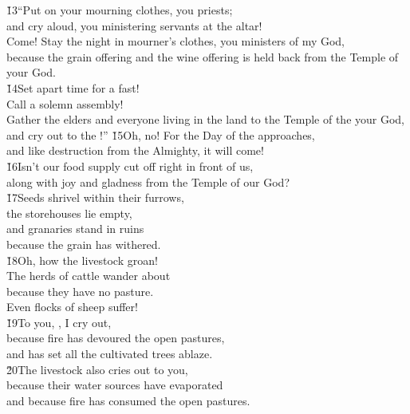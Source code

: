 \begin{poetry}
\poeml \v{13}``Put on your mourning clothes, you priests; \\
\poemll    and cry aloud, you ministering servants at the altar! \\
\poeml Come! Stay the night in mourner's clothes, you ministers of my God, \\
\poemll    because the grain offering and the wine offering is held back from the Temple of your God. \\
\poeml \v{14}Set apart time for a fast! \\
\poemll    Call a solemn assembly! \\
\poeml Gather the elders and everyone living in the land to the Temple of the  your God, \\
\poemll    and cry out to the !''
\poeml \v{15}Oh, no! For the Day of the  approaches, \\
\poemll    and like destruction from the Almighty, it will come! \\
\poeml \v{16}Isn't our food supply cut off right in front of us, \\
\poemll    along with joy and gladness from the Temple of our God? \\
\poeml \v{17}Seeds shrivel within their furrows, \\
\poemll    the storehouses lie empty, \\
\poeml and granaries stand in ruins \\
\poemll    because the grain has withered. \\
\poeml \v{18}Oh, how the livestock groan! \\
\poemll    The herds of cattle wander about \\
\poemlll       because they have no pasture. \\
\poeml Even flocks of sheep suffer! \\
\poeml \v{19}To you, , I cry out, \\
\poemll    because fire has devoured the open pastures, \\
\poemlll       and has set all the cultivated trees ablaze. \\
\poeml \v{20}The livestock also cries out to you, \\
\poemll    because their water sources have evaporated \\
\poemlll       and because fire has consumed the open pastures.
\end{poetry}

